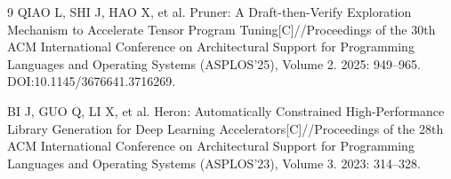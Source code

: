 \documentclass[11pt,twocolumn]{ctexart}
\begin{document}
\begin{thebibliography}{9}
QIAO L, SHI J, HAO X, et al. Pruner: A Draft-then-Verify Exploration Mechanism to Accelerate Tensor Program Tuning[C]//Proceedings of the 30th ACM International Conference on Architectural Support for Programming Languages and Operating Systems (ASPLOS'25), Volume 2. 2025: 949--965. DOI:10.1145/3676641.3716269.

BI J, GUO Q, LI X, et al. Heron: Automatically Constrained High-Performance Library Generation for Deep Learning Accelerators[C]//Proceedings of the 28th ACM International Conference on Architectural Support for Programming Languages and Operating Systems (ASPLOS'23), Volume 3. 2023: 314--328.
\end{thebibliography}
\end{document}
